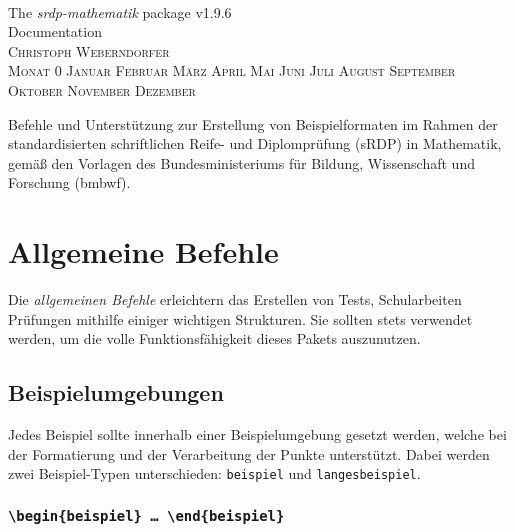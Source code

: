 \documentclass[a4paper,12pt]{article}
\makeatletter
\renewcommand*\tableofcontents{\@starttoc{toc}}
\newcommand{\Monat}{%
\ifcase\month
 Monat 0 \or Januar \or Februar \or März  \or April \or Mai \or Juni \or Juli%
 \or August \or September \or Oktober \or November \or Dezember
\fi}
\makeatother
\begin{document}
\begin{titlepage}
\thispagestyle{empty}
\begin{center}
~

\vfill

\Huge The \textit{srdp-mathematik} package v1.9.6\\[1cm]

Documentation \\ [1cm]

\flushright
\textsc{\large Christoph Weberndorfer} \\[-0.5cm]
\textsc{\large \Monat~\the\year} \\ 
\vspace{\baselineskip}

\vfill

\centering
\normalsize 
Befehle und Unterstützung zur Erstellung von Beispielformaten im Rahmen der standardisierten schriftlichen Reife- und Diplomprüfung (sRDP) in Mathematik, gemäß den Vorlagen des Bundesministeriums für Bildung, Wissenschaft und Forschung (bmbwf). 
\vfill 

\begingroup
\let\cleardoublepage\relax
\let\clearpage\relax
\normalsize \tableofcontents
\endgroup

\leer


\end{center}


\end{titlepage}


\section{Allgemeine Befehle}
Die \textit{allgemeinen Befehle} erleichtern das Erstellen von Tests, Schularbeiten Prüfungen mithilfe einiger wichtigen Strukturen. Sie sollten stets verwendet werden, um die volle Funktionsfähigkeit dieses Pakets auszunutzen. 
\vspace{1cm}

\subsection{Beispielumgebungen}

Jedes Beispiel sollte innerhalb einer Beispielumgebung gesetzt werden, welche bei der Formatierung und der Verarbeitung der Punkte unterstützt. Dabei werden zwei Beispiel-Typen unterschieden: \texttt{beispiel} und \texttt{langesbeispiel}.   

\vspace{1cm}
\subsubsection{\texttt{\textbackslash begin\{beispiel\} \ldots\ \textbackslash end\{beispiel\}}}
\end{document}
